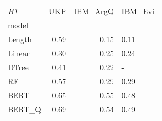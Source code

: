 \begin{tabular}{lrrl}
\toprule
\textit{BT} &   UKP &  IBM\_ArgQ & IBM\_Evi \\
model  &       &           &         \\
\midrule
Length &  0.59 &      0.15 &    0.11 \\
Linear &  0.30 &      0.25 &    0.24 \\
DTree  &  0.41 &      0.22 &       - \\
RF     &  0.57 &      0.29 &    0.29 \\
BERT   &  0.65 &      0.55 &    0.48 \\
BERT\_Q &  0.69 &      0.54 &    0.49 \\
\bottomrule
\end{tabular}
